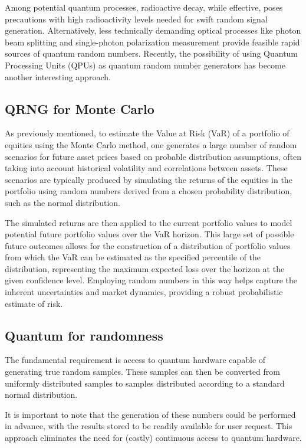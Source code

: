 \documentclass{article}
\begin{document}
Among potential quantum processes, radioactive decay, while effective, poses precautions with high radioactivity levels needed for swift random signal generation. Alternatively, less technically demanding optical processes like photon beam splitting and single-photon polarization measurement provide feasible rapid sources of quantum random numbers.
Recently, the possibility of using Quantum Processing Units (QPUs) as quantum random number generators has become another interesting approach.

\subsection{QRNG for Monte Carlo}
As previously mentioned, to estimate the Value at Risk (VaR) of a portfolio of equities using the Monte Carlo method, one generates a large number of random scenarios for future asset prices based on probable distribution assumptions, often taking into account historical volatility and correlations between assets. 
These scenarios are typically produced by simulating the returns of the equities in the portfolio using random numbers derived from a chosen probability distribution, such as the normal distribution. 

The simulated returns are then applied to the current portfolio values to model potential future portfolio values over the VaR horizon. 
This large set of possible future outcomes allows for the construction of a distribution of portfolio values from which the VaR can be estimated as the specified percentile of the distribution, representing the maximum expected loss over the horizon at the given confidence level. 
Employing random numbers in this way helps capture the inherent uncertainties and market dynamics, providing a robust probabilistic estimate of risk.

\subsection{Quantum for randomness}
The fundamental requirement is access to quantum hardware capable of generating true random samples. These samples can then be converted from uniformly distributed samples to samples distributed according to a standard normal distribution.

It is important to note that the generation of these numbers could be performed in advance, with the results stored to be readily available for user request. This approach eliminates the need for (costly) continuous access to quantum hardware.
\end{document}
